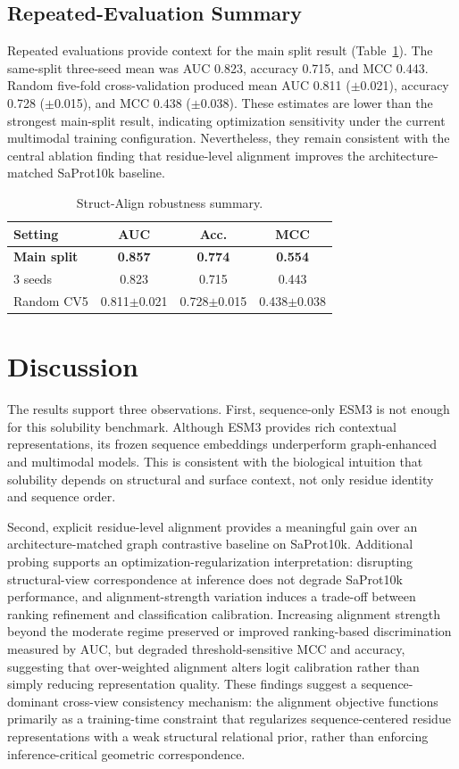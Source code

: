 \documentclass[conference]{IEEEtran}
\begin{document}
\subsection{Repeated-Evaluation Summary}
Repeated evaluations provide context for the main split result (Table~\ref{tab:robustness}). The same-split three-seed mean was AUC 0.823, accuracy 0.715, and MCC 0.443. Random five-fold cross-validation produced mean AUC 0.811 ($\pm$0.021), accuracy 0.728 ($\pm$0.015), and MCC 0.438 ($\pm$0.038). These estimates are lower than the strongest main-split result, indicating optimization sensitivity under the current multimodal training configuration. Nevertheless, they remain consistent with the central ablation finding that residue-level alignment improves the architecture-matched SaProt10k baseline.

\begin{table}[t]
\centering
\caption{Struct-Align robustness summary.}
\label{tab:robustness}
\small
\scriptsize
\begin{tabular}{@{}lccc@{}}
\toprule
Setting & AUC & Acc. & MCC \\
\midrule
\rowcolor{gray!12}\textbf{Main split} & \textbf{0.857} & \textbf{0.774} & \textbf{0.554} \\
3 seeds & 0.823 & 0.715 & 0.443 \\
Random CV5 & 0.811{\scriptsize$\pm$0.021} & 0.728{\scriptsize$\pm$0.015} & 0.438{\scriptsize$\pm$0.038} \\
\bottomrule
\end{tabular}
\end{table}

\section{Discussion}
The results support three observations. First, sequence-only ESM3 is not enough for this solubility benchmark. Although ESM3 provides rich contextual representations, its frozen sequence embeddings underperform graph-enhanced and multimodal models. This is consistent with the biological intuition that solubility depends on structural and surface context, not only residue identity and sequence order.

Second, explicit residue-level alignment provides a meaningful gain over an architecture-matched graph contrastive baseline on SaProt10k. Additional probing supports an optimization-regularization interpretation: disrupting structural-view correspondence at inference does not degrade SaProt10k performance, and alignment-strength variation induces a trade-off between ranking refinement and classification calibration. Increasing alignment strength beyond the moderate regime preserved or improved ranking-based discrimination measured by AUC, but degraded threshold-sensitive MCC and accuracy, suggesting that over-weighted alignment alters logit calibration rather than simply reducing representation quality. These findings suggest a sequence-dominant cross-view consistency mechanism: the alignment objective functions primarily as a training-time constraint that regularizes sequence-centered residue representations with a weak structural relational prior, rather than enforcing inference-critical geometric correspondence.
\end{document}
